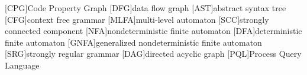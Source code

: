  
[CPG]{Code Property Graph}
[DFG]{data flow graph}
[AST]{abstract syntax tree}
[CFG]{context free grammar}
[MLFA]{multi-level automaton}
[SCC]{strongly connected component}
[NFA]{nondeterministic finite automaton}
[DFA]{deterministic finite automaton}
[GNFA]{generalized nondeterministic finite automaton}
[SRG]{strongly regular grammar}
[DAG]{directed acyclic graph}
[PQL]{Process Query Language}
